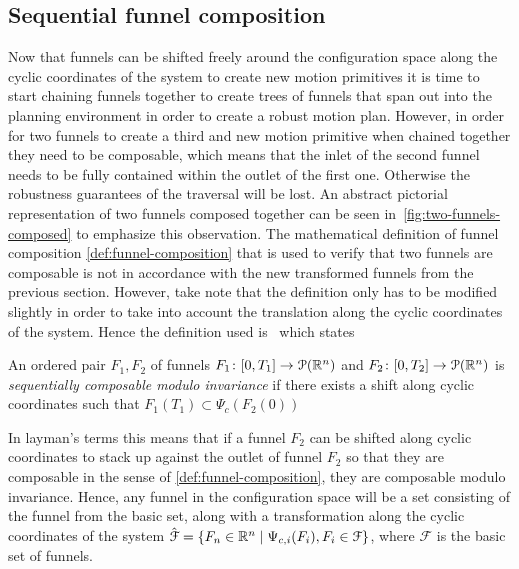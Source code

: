 \subsection{Sequential funnel composition}
\label{sec:composable-funnels}

Now that funnels can be shifted freely around the configuration space along the
cyclic coordinates of the system to create new motion primitives it is time to
start chaining funnels together to create trees of funnels that span out into
the planning environment in order to create a robust motion plan. However, in
order for two funnels to create a third and new motion primitive when chained
together they need to be composable, which means that the inlet of the second
funnel needs to be fully contained within the outlet of the first one. Otherwise
the robustness guarantees of the traversal will be lost. An abstract pictorial
representation of two funnels composed together can be seen
in~\cref{fig:two-funnels-composed} to emphasize this observation. The
mathematical definition of funnel composition \cref{def:funnel-composition} that
is used to verify that two funnels are composable is not in accordance with the
new transformed funnels from the previous section. However, take note that the
definition only has to be modified slightly in order to take into account the
translation along the cyclic coordinates of the system. Hence the definition
used is~\cite[definition~3,sec~5]{majumdarFunnelLibrariesRealtime2017} which
states
\begin{definition}
  An ordered pair \(F_1,F_2\) of funnels \(F_1 \colon [0,T_1] \rightarrow
  \mathcal{P}(\mathbb{R}^n)\) and \(F_2 \colon [0,T_2] \rightarrow \mathcal{P}(\mathbb{R}^n)\)
  is \textit{sequentially composable modulo invariance} if there exists a shift
  along cyclic coordinates such that \(F_{1}(T_1) \subset
  \Psi_{c}\left(F_2(0)\right)\)
\end{definition}
In layman's terms this means that if a funnel \(F_2\) can be shifted along
cyclic coordinates to stack up against the outlet of funnel \(F_2\) so that they
are composable in the sense of \cref{def:funnel-composition}, they are
composable modulo invariance. Hence, any funnel in the configuration space will
be a set consisting of the funnel from the basic set, along with a
transformation along the cyclic coordinates of the system \(\hat{\mathcal{F}} =
\lbrace F_n \in \mathbb{R}^n \mid \Psi_{c,i}(F_i), F_i \in \mathcal{F}\rbrace\), where
\(\mathcal{F}\) is the basic set of funnels.

